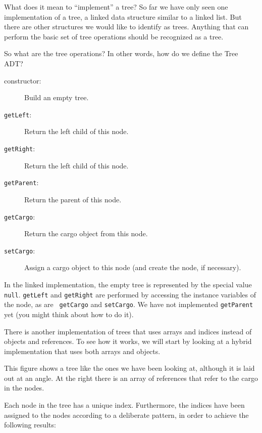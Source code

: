 What does it mean to ``implement'' a tree?  So far we have only seen
one implementation of a tree, a linked data structure similar to a
linked list.  But there are other structures we would like to identify
as trees.  Anything that can perform the basic set of tree operations
should be recognized as a tree.

So what are the tree operations?  In other words, how do we define
the Tree ADT?

\begin{description}

\item[constructor:]  Build an empty tree.

\item[{\tt getLeft}:]  Return the left child of this node.

\item[{\tt getRight}:]  Return the left child of this node.

\item[{\tt getParent}:]  Return the parent of this node.

\item[{\tt getCargo}:]  Return the cargo object from this node.

\item[{\tt setCargo}:]  Assign a cargo object to this node
(and create the node, if necessary).

\end{description}

In the linked implementation, the empty tree is represented by the
special value {\tt null}.  {\tt getLeft} and {\tt getRight} are
performed by accessing the instance variables of the node, as are {\tt
getCargo} and {\tt setCargo}.  We have not implemented {\tt getParent}
yet (you might think about how to do it).

There is another implementation of trees that uses arrays and
indices instead of objects and references.  To see how it works,
we will start by looking at a hybrid implementation that uses
both arrays and objects.

This figure shows a tree like the ones we have been looking at,
although it is laid out at an angle.
At the right there is an array of
references that refer to the cargo in the nodes.


Each node in the tree has a unique index.
Furthermore, the indices have been assigned to the nodes according
to a deliberate pattern, in order to achieve the following
results:

